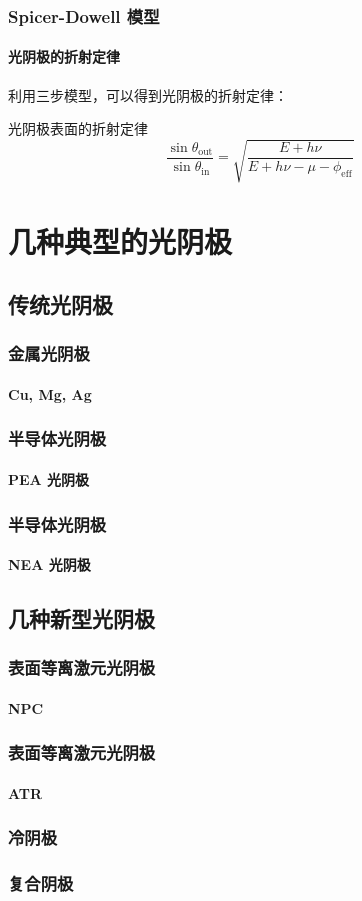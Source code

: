 \documentclass[ignorenonframetext, t]{beamer}
\begin{document}
\begin{frame}[label=current]
	\frametitle{Spicer-Dowell 模型}
	\framesubtitle{光阴极的折射定律}
	利用三步模型，可以得到光阴极的折射定律：
	\begin{formula}{光阴极表面的折射定律}
	\[
	\frac{\sin\theta_\mathrm{out}}{\sin\theta_\mathrm{in}}=\sqrt{\frac{E+h\nu}{E+h\nu-\mu-\phi_\mathrm{eff}}}
	\]
	\end{formula}
\end{frame}

%
%
%
%
%
%

\section{几种典型的光阴极}

\subsection{传统光阴极}

\begin{frame}
	\frametitle{金属光阴极}
	\framesubtitle{Cu, Mg, Ag}
	
\end{frame}

\begin{frame}
	\frametitle{半导体光阴极}
	\framesubtitle{PEA 光阴极}
\end{frame}

\begin{frame}
	\frametitle{半导体光阴极}
	\framesubtitle{NEA 光阴极}
\end{frame}

\subsection{几种新型光阴极}

\begin{frame}
	\frametitle{表面等离激元光阴极}
	\framesubtitle{NPC}
\end{frame}

\begin{frame}
	\frametitle{表面等离激元光阴极}
	\framesubtitle{ATR}
\end{frame}

\begin{frame}
	\frametitle{冷阴极}
\end{frame}

\begin{frame}
	\frametitle{复合阴极}
\end{frame}
\end{document}
